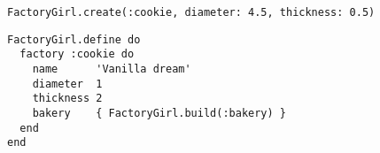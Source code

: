 \begin{lstlisting}[caption=Example usage of the factory defined in code listing \ref{lst:factory_def}.,
                   label=lst:factory_use, float=t]
FactoryGirl.create(:cookie, diameter: 4.5, thickness: 0.5)
\end{lstlisting}

\begin{lstlisting}[caption=A factory definition for a Cookie model.,
                   label=lst:factory_def, float=t]
FactoryGirl.define do
  factory :cookie do
    name      'Vanilla dream'
    diameter  1
    thickness 2
    bakery    { FactoryGirl.build(:bakery) }
  end
end
\end{lstlisting}


